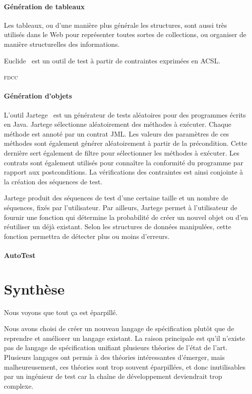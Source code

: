 \paragraph{Génération de tableaux} Les tableaux, ou d'une manière plus générale
les structures, sont aussi très utilisés dans le Web pour représenter toutes
sortes de collections, ou organiser de manière structurelles des informations.

Euclide~ est un outil de test à partir de contraintes exprimées
en ACSL.

{\scshape fdcc}~

\paragraph{Génération d'objets} L'outil Jartege~ est un
générateur de tests aléatoires pour des programmes écrits en Java. Jartege
sélectionne aléatoirement des méthodes à exécuter. Chaque méthode est annoté par
un contrat JML. Les valeurs des paramètres de ces méthodes sont également
générer aléatoirement à partir de la précondition. Cette dernière sert également
de filtre pour sélectionner les méthodes à exécuter. Les contrats sont également
utilisés pour connaître la conformité du programme par rapport aux
postconditions. La vérifications des contraintes est ainsi conjointe à la
création des séquences de test.

Jartege produit des séquences de test d'une certaine taille et un nombre de
séquences, fixés par l'utilisateur. Par ailleurs, Jartege permet à l'utilisateur
de fournir une fonction qui détermine la probabilité de créer un nouvel objet ou
d'en réutiliser un déjà existant. Selon les structures de données manipulées,
cette fonction permettra de détecter plus ou moins d'erreurs.

\paragraph{AutoTest}

\section{Synthèse}

Nous voyons que tout ça est éparpillé.

Nous avons choisi de créer un nouveau langage de spécification plutôt que de
reprendre et améliorer un langage existant.
La raison principale est qu'il n'existe pas de langage de spécification unifiant
plusieurs théories de l'état de l'art. Plusieurs langages ont permis à des
théories intéressantes d'émerger, mais malheureusement, ces théories sont
trop souvent éparpillées, et donc inutilisables par un ingénieur de test car la
chaîne de développement deviendrait trop complexe.


